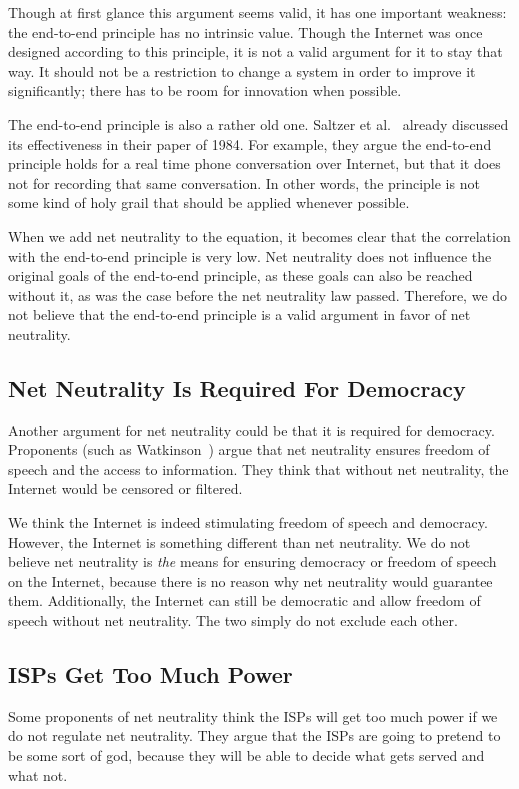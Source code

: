 Though at first glance this argument seems valid, it has one important weakness: the end-to-end principle has no intrinsic value. Though the Internet was once designed according to this principle, it is not a valid argument for it to stay that way.
It should not be a restriction to change a system in order to improve it significantly; there has to be room for innovation when possible.

The end-to-end principle is also a rather old one.
Saltzer et al.~\cite{saltzer1984end} already discussed its effectiveness in their paper of 1984.
For example, they argue the end-to-end principle holds for a real time phone conversation over Internet, but that it does not for recording that same conversation.
In other words, the principle is not some kind of holy grail that should be applied whenever possible.

When we add net neutrality to the equation, it becomes clear that the correlation with the end-to-end principle is very low.
Net neutrality does not influence the original goals of the end-to-end principle, as these goals can also be reached without it, as was the case before the net neutrality law passed.
Therefore, we do not believe that the end-to-end principle is a valid argument in favor of net neutrality.

\subsection{Net Neutrality Is Required For Democracy}
Another argument for net neutrality could be that it is required for democracy.
Proponents (such as Watkinson~\cite{watkinson2012democracy}) argue that net neutrality ensures freedom of speech and the access to information.
They think that without net neutrality, the Internet would be censored or filtered.

We think the Internet is indeed stimulating freedom of speech and democracy.
However, the Internet is something different than net neutrality.
We do not believe net neutrality is \emph{the} means for ensuring democracy or freedom of speech on the Internet, because there is no reason why net neutrality would guarantee them.
Additionally, the Internet can still be democratic and allow freedom of speech without net neutrality.
The two simply do not exclude each other.

\subsection{\acp{ISP} Get Too Much Power}
Some proponents of net neutrality think the \acp{ISP} will get too much power if we do not regulate net neutrality.
They argue that the \acp{ISP} are going to pretend to be some sort of god, because they will be able to decide what gets served and what not. %


